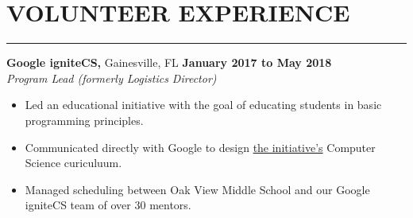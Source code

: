 \section*{VOLUNTEER EXPERIENCE}

\hrule \relax
\sectionheaderspace

\noindent\textbf{Google igniteCS,} Gainesville, FL \hfill\textbf{January 2017 to May 2018}\\
\textit{Program Lead (formerly Logistics Director)}
\begin{itemize}[noitemsep,nolistsep, label = {-}]
	\item Led an educational initiative with the goal of educating students in basic programming principles.
	\item Communicated directly with Google to design \href{https://sites.google.com/view/ignitecs/home}{the initiative's} Computer Science curiculuum.
	\item Managed scheduling between Oak View Middle School and our Google igniteCS team of over 30 mentors.
\end{itemize} 
\subsectionspace